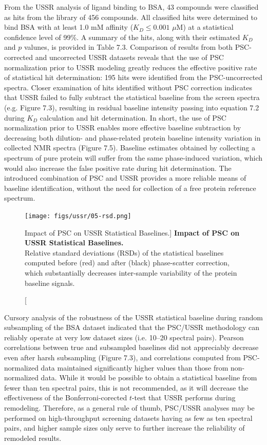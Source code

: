 \begin{doublespace}
From the USSR analysis of ligand binding to BSA, 43 compounds were classified
as hits from the library of 456 compounds. All classified hits were determined
to bind BSA with at least 1.0 mM affinity ($K_D \le 0.001$ $\mu$M) at a
statistical confidence level of 99\%. A summary of the hits, along with their
estimated $K_D$ and $p$ valunes, is provided in Table 7.3. Comparison of
results from both PSC-corrected and uncorrected USSR datasets reveals that the
use of PSC normalization prior to USSR modeling greatly reduces the effective
positive rate of statistical hit determination: 195 hits were identified from
the PSC-uncorrected spectra. Closer examination of hits identified without PSC
correction indicates that USSR failed to fully subtract the statistical
baseline from the screen spectra (e.g. Figure 7.3), resulting in residual
baseline intensity passing into equation 7.2 during $K_D$ calculation and hit
determination. In short, the use of PSC normalization prior to USSR enables
more effective baseline subtraction by decreasing both dilution- and
phase-related protein baseline intensity variation in collected \hnmr{} NMR
spectra (Figure 7.5). Baseline estimates obtained by collecting a spectrum of
pure protein will suffer from the same phase-induced variation, which would
also increase the false positive rate during hit determination. The introduced
combination of PSC and USSR provides a more reliable means of baseline
identification, without the need for collection of a free protein reference
spectrum.
\end{doublespace}

\begin{figure}
\texttt{[image: figs/ussr/05-rsd.png]}
\caption
      [Impact of PSC on USSR Statistical Baselines.]{
  {\bf Impact of PSC on USSR Statistical Baselines.}
  \\
  Relative standard deviations (RSDs) of the statistical baselines computed
  before (red) and after (black) phase-scatter correction, which substantially
  decreases inter-sample variability of the protein baseline signals.
}
\end{figure}

\begin{doublespace}
Cursory analysis of the robustness of the USSR statistical
baseline during random subsampling of the BSA dataset indicated that the
PSC/USSR methodology can reliably operate at very low dataset sizes
(i.e. 10--20 spectral pairs). Pearson correlations between true and subsampled
baselines did not appreciably decrease even after harsh subsampling
(Figure 7.3), and correlations computed from PSC-normalized data maintained
significantly higher values than those from non-normalized data. While it
would be possible to obtain a statistical baseline from fewer than ten spectral
pairs, this is not recommended, as it will decrease the effectiveness of the
Bonferroni-corected $t$-test that USSR performs during remodeling. Therefore,
as a general rule of thumb, PSC/USSR analyses may be performed on
high-throughput screening datasets having as few as ten spectral pairs, and
higher sample sizes only serve to further increase the reliability of remodeled
results.
\end{doublespace}

